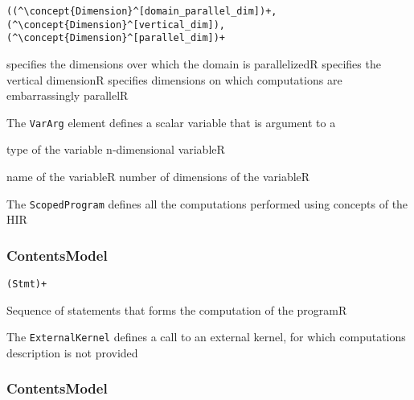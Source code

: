 \begin{lstlisting}[style=default]
((^\concept{Dimension}^[domain_parallel_dim])+, (^\concept{Dimension}^[vertical_dim]), (^\concept{Dimension}^[parallel_dim])+
\end{lstlisting}

\begin{HIRChildElements}
	{specifies the dimensions over which the domain is parallelized}{R}
	{specifies the vertical dimension}{R}
	{specifies dimensions on which computations are embarrassingly parallel}{R}	
\end{HIRChildElements}

The {\tt VarArg} element defines a scalar variable that is argument to a 


\begin{HIRChildElements}
	{type of the variable n-dimensional variable}{R}
\end{HIRChildElements}

\begin{HIRAttributes}
	{name of the variable}{R}
	{number of dimensions of the variable}{R}
\end{HIRAttributes}


The {\tt ScopedProgram} defines all the computations performed using concepts of the HIR

\subsubsection*{ContentsModel}{}

\begin{lstlisting}[style=default]
(Stmt)+
\end{lstlisting}

\begin{HIRChildElements}
	{Sequence of statements that forms the computation of the program}{R}
\end{HIRChildElements}


The {\tt ExternalKernel} defines a call to an external kernel, for which computations description is not provided

\subsubsection*{ContentsModel}{}


